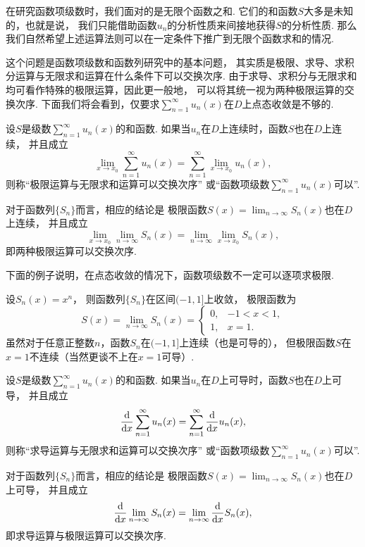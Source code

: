在研究函数项级数时，我们面对的是无限个函数之和.
它们的和函数\(S\)大多是未知的，也就是说，
我们只能借助函数\(u_n\)的分析性质来间接地获得\(S\)的分析性质.
那么我们自然希望上述运算法则可以在一定条件下推广到无限个函数求和的情况.

这个问题是函数项级数和函数列研究中的基本问题，
其实质是极限、求导、求积分运算与无限求和运算在什么条件下可以交换次序.
由于求导、求积分与无限求和均可看作特殊的极限运算，因此更一般地，
可以将其统一视为两种极限运算的交换次序.
下面我们将会看到，仅要求\(\sum_{n=1}^\infty u_n(x)\)在\(D\)上点态收敛是不够的.

\begin{definition}
设\(S\)是级数\(\sum_{n=1}^\infty u_n(x)\)的和函数.
如果当\(u_n\)在\(D\)上连续时，函数\(S\)也在\(D\)上连续，
并且成立\[
	\lim_{x \to x_0} \sum_{n=1}^\infty u_n(x)
	= \sum_{n=1}^\infty \lim_{x \to x_0} u_n(x),
\]
则称“极限运算与无限求和运算可以交换次序”
或“函数项级数\(\sum_{n=1}^\infty u_n(x)\)可以”.
\end{definition}
对于函数列\(\{S_n\}\)而言，相应的结论是
极限函数\(S(x) = \lim_{n\to\infty} S_n(x)\)也在\(D\)上连续，
并且成立\[
	\lim_{x \to x_0} \lim_{n\to\infty} S_n(x)
	= \lim_{n\to\infty} \lim_{x \to x_0} S_n(x),
\]
即两种极限运算可以交换次序.

下面的例子说明，在点态收敛的情况下，函数项级数不一定可以逐项求极限.
\begin{example}\label{example:函数项级数.点态收敛情况下和函数可能不连续}
设\(S_n(x) = x^n\)，
则函数列\(\{S_n\}\)在区间\((-1,1]\)上收敛，
极限函数为\[
	S(x) = \lim_{n\to\infty} S_n(x)
	= \left\{ \begin{array}{ll}
		0, & -1<x<1, \\
		1, & x=1.
	\end{array} \right.
\]
虽然对于任意正整数\(n\)，函数\(S_n\)在\((-1,1]\)上连续（也是可导的），
但极限函数\(S\)在\(x=1\)不连续（当然更谈不上在\(x=1\)可导）.
\end{example}

\begin{definition}
设\(S\)是级数\(\sum_{n=1}^\infty u_n(x)\)的和函数.
如果当\(u_n\)在\(D\)上可导时，函数\(S\)也在\(D\)上可导，
并且成立\[
	\dv{x} \sum_{n=1}^\infty u_n(x)
	= \sum_{n=1}^\infty \dv{x} u_n(x),
\]
则称“求导运算与无限求和运算可以交换次序”
或“函数项级数\(\sum_{n=1}^\infty u_n(x)\)可以”.
\end{definition}
对于函数列\(\{S_n\}\)而言，相应的结论是
极限函数\(S(x) = \lim_{n\to\infty} S_n(x)\)也在\(D\)上可导，
并且成立\[
	\dv{x} \lim_{n\to\infty} S_n(x)
	= \lim_{n\to\infty} \dv{x} S_n(x),
\]
即求导运算与极限运算可以交换次序.

